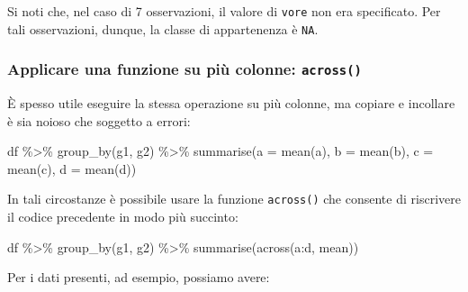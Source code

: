 \documentclass[
  10pt,
  italian,
  a4paper,
  extrafontsizes,onecolumn,openright
  ]{memoir}
\newenvironment{Shaded}{\begin{snugshade}}{\end{snugshade}}
\newcommand{\AttributeTok}[1]{\textcolor[rgb]{0.77,0.63,0.00}{#1}}
\newcommand{\FunctionTok}[1]{\textcolor[rgb]{0.00,0.00,0.00}{#1}}
\newcommand{\NormalTok}[1]{#1}
\newcommand{\SpecialCharTok}[1]{\textcolor[rgb]{0.00,0.00,0.00}{#1}}
\begin{document}
\noindent
Si noti che, nel caso di 7 osservazioni, il valore di \texttt{vore} non era
specificato. Per tali osservazioni, dunque, la classe di appartenenza è
\texttt{NA}.

\hypertarget{applicare-una-funzione-su-piuxf9-colonne-across}{%
\subsubsection{\texorpdfstring{Applicare una funzione su più colonne: \texttt{across()}}{Applicare una funzione su più colonne: across()}}\label{applicare-una-funzione-su-piuxf9-colonne-across}}

È spesso utile eseguire la stessa operazione su più colonne, ma copiare e incollare è sia noioso che soggetto a errori:

\begin{Shaded}
\begin{Highlighting}[]
\NormalTok{df }\SpecialCharTok{\%\textgreater{}\%} 
  \FunctionTok{group\_by}\NormalTok{(g1, g2) }\SpecialCharTok{\%\textgreater{}\%} 
  \FunctionTok{summarise}\NormalTok{(}\AttributeTok{a =} \FunctionTok{mean}\NormalTok{(a), }\AttributeTok{b =} \FunctionTok{mean}\NormalTok{(b), }\AttributeTok{c =} \FunctionTok{mean}\NormalTok{(c), }\AttributeTok{d =} \FunctionTok{mean}\NormalTok{(d))}
\end{Highlighting}
\end{Shaded}

\noindent
In tali circostanze è possibile usare la funzione \texttt{across()} che consente di riscrivere il codice precedente in modo più succinto:

\begin{Shaded}
\begin{Highlighting}[]
\NormalTok{df }\SpecialCharTok{\%\textgreater{}\%} 
  \FunctionTok{group\_by}\NormalTok{(g1, g2) }\SpecialCharTok{\%\textgreater{}\%} 
  \FunctionTok{summarise}\NormalTok{(}\FunctionTok{across}\NormalTok{(a}\SpecialCharTok{:}\NormalTok{d, mean))}
\end{Highlighting}
\end{Shaded}

\noindent
Per i dati presenti, ad esempio, possiamo avere:
\end{document}
